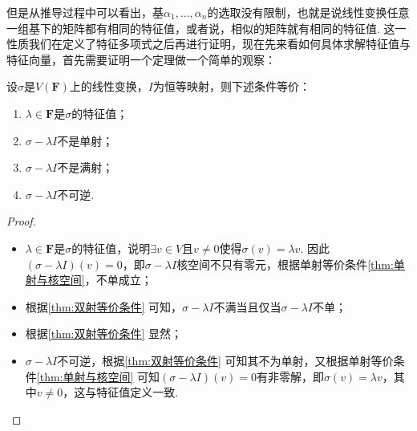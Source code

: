 但是从推导过程中可以看出，基$\alpha_1,\ldots,\alpha_n$的选取没有限制，也就是说线性变换任意一组基下的矩阵都有相同的特征值，或者说，相似的矩阵就有相同的特征值. 这一性质我们在定义了特征多项式之后再进行证明，现在先来看如何具体求解特征值与特征向量，首先需要证明一个定理做一个简单的观察：
\begin{theorem}{}{}
    设$\sigma$是$V(\mathbf{F})$上的线性变换，$I$为恒等映射，则下述条件等价：
    \begin{enumerate}[label=(\arabic*)]
        \item \label{item:18:特征值定义:1}
              $\lambda\in\mathbf{F}$是$\sigma$的特征值；

        \item \label{item:18:特征值定义:2}
              $\sigma-\lambda I$不是单射；

        \item \label{item:18:特征值定义:3}
              $\sigma-\lambda I$不是满射；

        \item \label{item:18:特征值定义:4}
              $\sigma-\lambda I$不可逆.
    \end{enumerate}
\end{theorem}

\begin{proof}
    \begin{itemize}
        \item[\ref*{item:18:特征值定义:1}$\implies$\ref*{item:18:特征值定义:2}] $\lambda\in\mathbf{F}$是$\sigma$的特征值，说明$\exists v\in V$且$v\neq 0$使得$\sigma(v)=\lambda v$. 因此$(\sigma-\lambda I)(v)=0$，即$\sigma-\lambda I$核空间不只有零元，根据单射等价条件\autoref{thm:单射与核空间}，不单成立；

        \item[\ref*{item:18:特征值定义:2}$\implies$\ref*{item:18:特征值定义:3}] 根据\autoref{thm:双射等价条件} 可知，$\sigma-\lambda I$不满当且仅当$\sigma-\lambda I$不单；

        \item[\ref*{item:18:特征值定义:3}$\implies$\ref*{item:18:特征值定义:4}] 根据\autoref*{thm:双射等价条件} 显然；

        \item[\ref*{item:18:特征值定义:4}$\implies$\ref*{item:18:特征值定义:1}] $\sigma-\lambda I$不可逆，根据\autoref*{thm:双射等价条件} 可知其不为单射，又根据单射等价条件\autoref*{thm:单射与核空间} 可知$(\sigma-\lambda I)(v)=0$有非零解，即$\sigma(v)=\lambda v$，其中$v\neq 0$，这与特征值定义一致.
    \end{itemize}
\end{proof}

